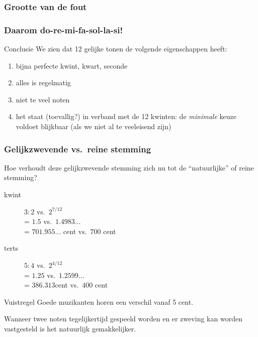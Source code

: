 \documentclass[compress, darktitle, framenumber, handout, totalframenumber]{beamer}
\begin{document}
\begin{frame}
  \frametitle{Grootte van de fout}

  \begin{center}
  \end{center}
\end{frame}

\begin{frame}
  \frametitle{Daarom do-re-mi-fa-sol-la-si!}

  \begin{block}{Conclusie}
    We zien dat \alert{12 gelijke tonen} de volgende eigenschappen heeft:
    \begin{enumerate}
      \item bijna perfecte kwint, kwart, seconde
      \item alles is regelmatig
      \item niet te veel noten
      \item het staat (toevallig?) in verband met de 12 kwinten: de \emph{minimale} keuze voldoet blijkbaar (als we niet al te veeleisend zijn)
    \end{enumerate}
  \end{block}
\end{frame}

\begin{frame}
  \frametitle{Gelijkzwevende vs.\ reine stemming}

  Hoe verhoudt deze gelijkzwevende stemming zich nu tot de ``natuurlijke'' of reine stemming?
  \pause
  \begin{description}
    \item[kwint] $3:2$ vs.\ $2^{7/12}$ \\
      \pause= $1.5$ vs.\ $1.4983\dotso$ \\
      \pause= $701.955\dotso$ cent vs.\ $700$ cent
    \item[terts] $5:4$ vs.\ $2^{4/12}$ \\
      \pause= $1.25$ vs.\ $1.2599\dotso$ \\
      \pause= $386.313$\dotso cent vs.\ $400$ cent
  \end{description}
  \begin{block}{Vuistregel}
    Goede muzikanten horen een verschil vanaf 5 cent.
  \end{block}
  Wanneer twee noten tegelijkertijd gespeeld worden en er zweving kan worden vastgesteld is het natuurlijk gemakkelijker.
\end{frame}
\end{document}
